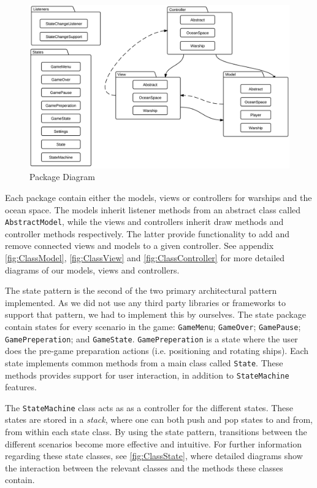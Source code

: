 \begin{figure}[ht]
    \includegraphics[width=\textwidth]{img/PackageDiagram.png}
    \caption{Package Diagram}
    \label{fig:PackageDiagram}
\end{figure}

Each package contain either the models, views or controllers for warships and the ocean space. The models inherit listener methods from an abstract class called \texttt{AbstractModel}, while the views and controllers inherit draw methods and controller methods respectively. The latter provide functionality to add and remove connected views and models to a given controller. See appendix \ref{fig:ClassModel}, \ref{fig:ClassView} and \ref{fig:ClassController} for more detailed diagrams of our models, views and controllers.





The state pattern is the second of the two primary architectural pattern implemented. As we did not use any third party libraries or frameworks to support that pattern, we had to implement this by ourselves. %
The state package contain states for every scenario in the game: \texttt{GameMenu}; \texttt{GameOver}; \texttt{GamePause}; \texttt{GamePreperation}; and \texttt{GameState}. \texttt{GamePreperation} is a state where the user does the pre-game preparation actions (i.e. positioning and rotating ships). Each state implements common methods from a main class called \texttt{State}. These methods provides support for user interaction, in addition to \texttt{StateMachine} features. %

The \texttt{StateMachine} class acts as as a controller for the different states. These states are stored in a \emph{stack}, where one can both push and pop states to and from, from within each state class. By using the state pattern, transitions between the different scenarios become more effective and intuitive. For further information regarding these state classes, see \ref{fig:ClassState}, where detailed diagrams show the interaction between the relevant classes and the methods these classes contain.

